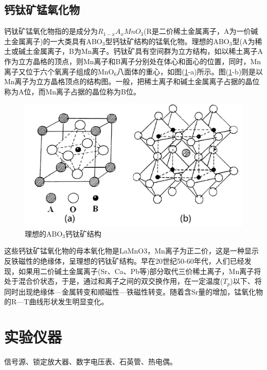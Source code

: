 \documentclass[a4paper]{article}
\begin{document}
\subsection{钙钛矿锰氧化物}
钙钛矿锰氧化物指的是成分为$R_{1-x}A_xMnO_3$(R是二价稀土金属离子，A为一价碱土金属离子)的一大类具有ABO$_3$型钙钛矿结构的锰氧化物。理想的ABO$_3$型(A为稀土或碱土金属离子，B为Mn离子。钙钛矿具有空间群为立方结构，如以稀土离子A作为立方晶格的顶点，则Mn离子和B离子分别处在体心和面心的位置，同时，Mn离子又位于六个氧离子组成的MnO$_6$八面体的重心，如图(\ref{fig3}-a)所示。图(\ref{fig3}-b)则是以Mn离子为立方晶格顶点的结构图。一般，把稀土离子和碱土金属离子占据的晶位称为A位，而Mn离子占据的晶位称为B位。
\begin{figure}[!h]
    \centering
    \includegraphics[width=\textwidth]{fig/fig3.pdf}
    \caption{理想的$\text{ABO}_3$钙钛矿结构}\label{fig3}
\end{figure}
这些钙钛矿锰氧化物的母本氧化物是LaMnO3，Mn离子为正二价，这是一种显示反铁磁性的绝缘体，呈理想的钙钛矿结构。早在20世纪50-60年代，人们已经发现，如果用二价碱土金属离子(Sr、Ca、Pb等)部分取代三价稀土离子，Mn离子将处于混合价状态，于是，通过和离子之间的双交换作用，在一定温度($T_p$)以下、将同时出现绝缘体—金属转变和顺磁性—铁磁性转变。随着含Sr量的增加，锰氧化物的R—T曲线形状发生明显变化。

\section{实验仪器}
信号源、锁定放大器、数字电压表、石英管、热电偶。
\end{document}
